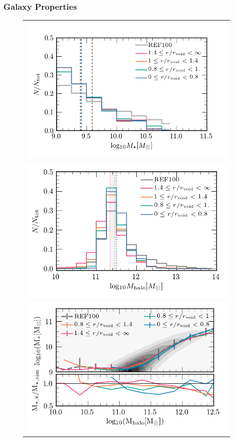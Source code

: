 \documentclass[a4paper,fleqn,usenatbib,letter]{mnras}
\begin{document}
\subsubsection{Galaxy Properties}
\begin{figure}	
	\begin{tabular}{c}
	\includegraphics[width=1\columnwidth]{plots_stellarmass_central/GMF_cs_three_regions.png} \\
	\includegraphics[width=1\columnwidth]{plots_stellarmass_central/HMF_cs_three_regions.png}\\
	\includegraphics[width=0.95\columnwidth]{plots_stellarmass_central/Mstar_Mhalov2.png} \\

\end{tabular}
\end{figure}
\end{document}
